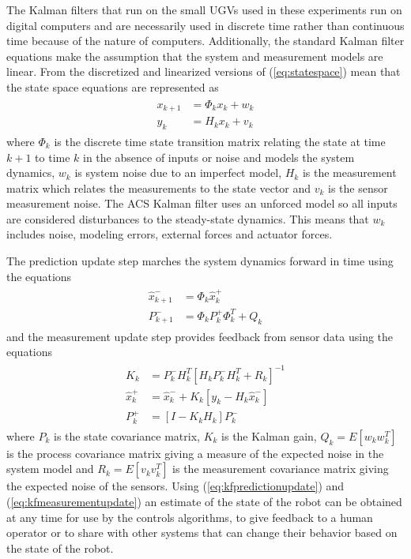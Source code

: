 The Kalman filters that run on the small UGVs used in these experiments run on digital computers and are necessarily used in discrete time rather than continuous time because of the nature of computers. Additionally, the standard Kalman filter equations make the assumption that the system and measurement models are linear. From \cite{Kelly_1994_338, Simon06OptimalEstimation} the discretized and linearized versions of (\ref{eq:statespace}) mean that the state space equations are represented as
\begin{align*}
\begin{split}
x_{k+1} &= \Phi_kx_k + w_k \\
y_k &= H_kx_k + v_k
\end{split}
\end{align*}
where $\Phi_k$ is the discrete time state transition matrix relating the state at time $k+1$ to time $k$ in the absence of inputs or noise and models the system dynamics, $w_k$ is system noise due to an imperfect model, $H_k$ is the measurement matrix which relates the measurements to the state vector and $v_k$ is the sensor measurement noise. The ACS Kalman filter uses an unforced model so all inputs are considered disturbances to the steady-state dynamics. This means that $w_k$ includes noise, modeling errors, external forces and actuator forces.

The prediction update step marches the system dynamics forward in time using the equations
\begin{align}
\label{eq:kfpredictionupdate}
\begin{split}
\hat{x}_{k+1}^- &= \Phi_k\hat{x}_k^+ \\
P_{k+1}^- &= \Phi_kP_k^+\Phi_k^T + Q_k
\end{split}
\end{align}
and the measurement update step provides feedback from sensor data using the equations
\begin{align}
\label{eq:kfmeasurementupdate}
\begin{split}
K_k &= P_k^-H_k^T\left[H_kP_k^-H_k^T + R_k\right]^{-1} \\
\hat{x}_k^+ &= \hat{x}_k^- + K_k\left[y_k - H_k\hat{x}_k^-\right] \\
P_k^+ &= \left[I - K_kH_k\right]P_k^-
\end{split}
\end{align}
where $P_k$ is the state covariance matrix, $K_k$ is the Kalman gain, $Q_k = E[w_kw_k^T]$ is the process covariance matrix giving a measure of the expected noise in the system model and $R_k = E[v_kv_k^T]$ is the measurement covariance matrix giving the expected noise of the sensors. Using (\ref{eq:kfpredictionupdate}) and (\ref{eq:kfmeasurementupdate}) an estimate of the state of the robot can be obtained at any time for use by the controls algorithms, to give feedback to a human operator or to share with other systems that can change their behavior based on the state of the robot.

